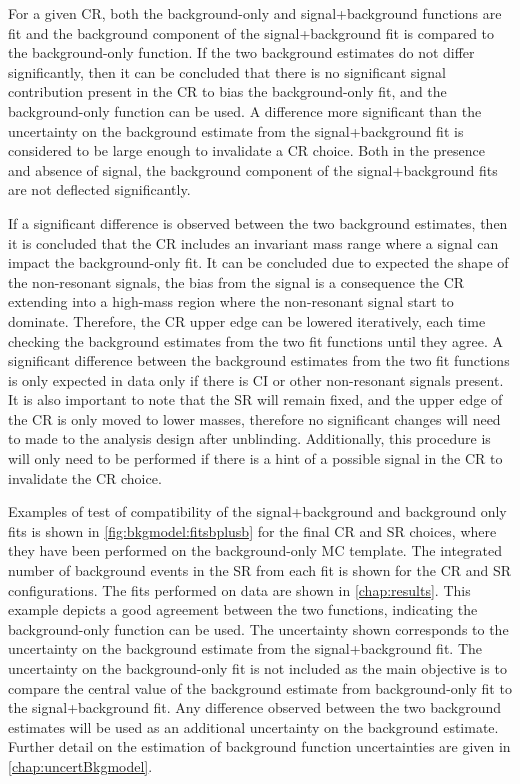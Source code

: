 For a given CR, both the background-only and signal+background functions are fit and the background component of the signal+background fit is compared to the background-only function. If the two background estimates do not differ significantly, then it can be concluded that there is no significant signal contribution present in the CR to bias the background-only fit, and the background-only function can be used. A difference  more significant than the uncertainty on the background estimate from the signal+background fit is considered to be large enough to invalidate a CR choice. Both in the presence and absence of signal, the background component of the signal+background fits are not deflected significantly. 

If a significant difference is observed between the two background estimates, then it is concluded that the CR includes an invariant mass range where a signal can impact the background-only fit. It can be concluded due to expected the shape of the non-resonant signals, the bias from the signal is a consequence the CR extending into a high-mass region where the non-resonant signal start to dominate. Therefore, the CR upper edge can be lowered iteratively, each time checking the background estimates from the two fit functions until they agree. A significant difference between the background estimates from the two fit functions is only expected in data only if there is CI or other non-resonant signals present. It is also important to note that the SR will remain fixed, and the upper edge of the CR is only moved to lower masses, therefore no significant changes will need to made to the analysis design after unblinding. Additionally, this procedure is will only need to be performed if there is a hint of a possible signal in the CR to invalidate the CR choice. 

Examples of test of compatibility of the signal+background and background only fits is shown in \cref{fig:bkgmodel:fitsbplusb} for the final CR and SR choices, where they have been performed on the background-only MC template. The integrated number of background events in the SR from each fit is shown for the CR and SR configurations. The fits performed on data are shown in \cref{chap:results}. This example depicts a good agreement between the two functions, indicating the background-only function can be used. The uncertainty shown corresponds to the uncertainty on the background estimate from the signal+background fit. The uncertainty on the background-only fit is not included as the main objective is to compare the central value of the background estimate from background-only fit to the signal+background fit. Any difference observed between the two background estimates will be used as an additional uncertainty on the background estimate. Further detail on the estimation of background function uncertainties are given in \cref{chap:uncertBkgmodel}. 

